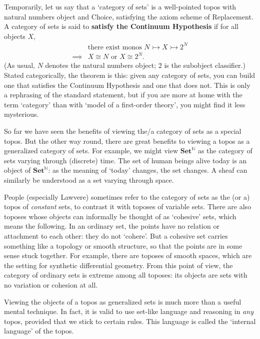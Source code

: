 \documentclass{article}
\newcommand{\fcat}[1]{\mathbf{#1}}
\newcommand{\Set}{\fcat{Set}}
\newcommand{\demph}[1]{\textbf{\textup{#1}}}
\newcommand{\iso}{\cong}
\newcommand{\nat}{\mathbb{N}}
\newcommand{\monic}{\rightarrowtail}
\begin{document}
Temporarily, let us say that a `category of sets' is a well-pointed topos with
natural numbers object and Choice, satisfying the axiom scheme of Replacement.
A category of sets is said to \demph{satisfy the Continuum Hypothesis} if for
all objects $X$,
% 
\begin{align*}
                &\text{there exist monos } N \monic X \monic 2^N        \\
\implies        &X \iso N \text{ or } X \iso 2^N.
\end{align*}
% 
(As usual, $N$ denotes the natural numbers object; $2$ is the subobject
classifier.)  Stated categorically, the theorem is this: given any category of
sets, you can build one that satisfies the Continuum Hypothesis and one that
does not.  This is only a rephrasing of the standard statement, but if you are
more at home with the term `category' than with `model of a first-order
theory', you might find it less mysterious.

So far we have seen the benefits of viewing the/a category of sets as a
special topos.  But the other way round, there are great benefits to viewing a
topos as a generalized category of sets.  For example, we might view
$\Set^\nat$ as the category of sets varying through (discrete) time.  The set
of human beings alive today is an object of $\Set^\nat$: as the meaning of
`today' changes, the set changes.  A sheaf can similarly be understood as a
set varying through space.

People (especially Lawvere) sometimes refer to the category of sets as the (or
a) topos of \emph{constant} sets, to contrast it with toposes of variable
sets.  There are also toposes whose objects can informally be thought of as
`cohesive' sets, which means the following.  In an ordinary set, the points
have no relation or attachment to each other: they do not `cohere'.  But a
cohesive set carries something like a topology or smooth structure, so that
the points are in some sense stuck together.  For example, there are toposes of
smooth spaces, which are the setting for synthetic differential geometry.
From this point of view, the category of ordinary sets is extreme among all
toposes: its objects are sets with no variation or cohesion at all.

Viewing the objects of a topos as generalized sets is much more than a useful
mental technique.  In fact, it is valid to use set-like language and reasoning
in \emph{any} topos, provided that we stick to certain rules.  This language
is called the `internal language' of the topos.  
\end{document}
